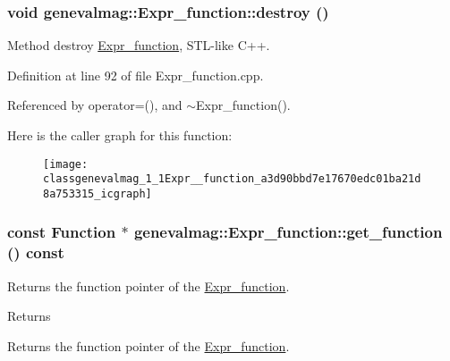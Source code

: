 \hypertarget{classgenevalmag_1_1Expr__function_a3d90bbd7e17670edc01ba21d8a753315}{
\subsubsection[{destroy}]{\setlength{\rightskip}{0pt plus 5cm}void genevalmag::Expr\_\-function::destroy ()}}
\label{classgenevalmag_1_1Expr__function_a3d90bbd7e17670edc01ba21d8a753315}
Method destroy \hyperlink{classgenevalmag_1_1Expr__function}{Expr\_\-function}, STL-\/like C++. 

Definition at line 92 of file Expr\_\-function.cpp.



Referenced by operator=(), and $\sim$Expr\_\-function().



Here is the caller graph for this function:\nopagebreak
\begin{figure}[H]
\begin{center}
\leavevmode
\texttt{[image: classgenevalmag\_1\_1Expr\_\_function\_a3d90bbd7e17670edc01ba21d8a753315\_icgraph]}
\end{center}
\end{figure}


\hypertarget{classgenevalmag_1_1Expr__function_a7f1fedb3efc2c8eaf07877a8e72a2579}{
\subsubsection[{get\_\-function}]{\setlength{\rightskip}{0pt plus 5cm}const {\bf Function} $\ast$ genevalmag::Expr\_\-function::get\_\-function () const}}
\label{classgenevalmag_1_1Expr__function_a7f1fedb3efc2c8eaf07877a8e72a2579}
Returns the function pointer of the \hyperlink{classgenevalmag_1_1Expr__function}{Expr\_\-function}. \begin{DoxyReturn}{Returns}

\end{DoxyReturn}
Returns the function pointer of the \hyperlink{classgenevalmag_1_1Expr__function}{Expr\_\-function}. 


